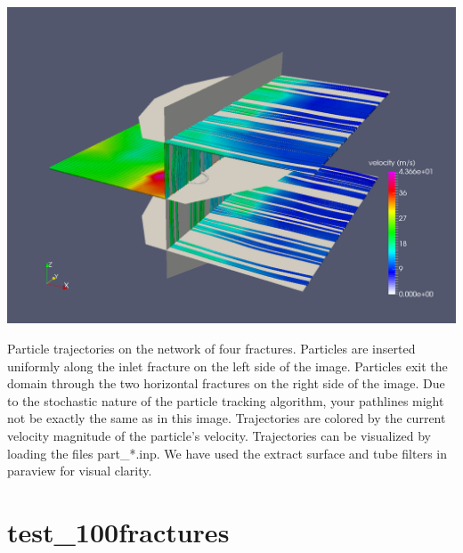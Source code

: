 \documentclass{article}
\begin{document}
\begin{center}
\includegraphics[width=0.75\linewidth]{figs/test_4_fracture_trajectories.png}\\
\end{center}
 Particle trajectories on the network of four fractures.   
Particles are inserted uniformly along the inlet fracture on the left side of the image. 
Particles exit the domain through the two horizontal fractures on the right side of the image.  
Due to the stochastic nature of the particle tracking algorithm, your pathlines might not be exactly the same as in this image. 
Trajectories are colored by the current velocity magnitude of the particle's velocity. 
Trajectories can be visualized by loading the files part\_*.inp. 
 We have used the extract surface and tube filters in paraview for visual clarity. 


\newpage 

\newpage

\section{test\_100fractures}
\end{document}
